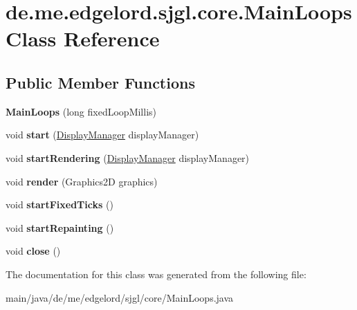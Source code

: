 \hypertarget{classde_1_1me_1_1edgelord_1_1sjgl_1_1core_1_1_main_loops}{}\section{de.\+me.\+edgelord.\+sjgl.\+core.\+Main\+Loops Class Reference}
\label{classde_1_1me_1_1edgelord_1_1sjgl_1_1core_1_1_main_loops}
\subsection*{Public Member Functions}
\begin{DoxyCompactItemize}
\item 
\mbox{\label{classde_1_1me_1_1edgelord_1_1sjgl_1_1core_1_1_main_loops_a852f58bdc48b19598f604e90a3913b29}} 
{\bfseries Main\+Loops} (long fixed\+Loop\+Millis)
\item 
\mbox{\label{classde_1_1me_1_1edgelord_1_1sjgl_1_1core_1_1_main_loops_a9b555b5a8a1d264fee9acd6e4fb5af00}} 
void {\bfseries start} (\mbox{\hyperlink{classde_1_1me_1_1edgelord_1_1sjgl_1_1display_1_1_display_manager}{Display\+Manager}} display\+Manager)
\item 
\mbox{\label{classde_1_1me_1_1edgelord_1_1sjgl_1_1core_1_1_main_loops_a9016a69b3dd76f3eb54d68acd83741bd}} 
void {\bfseries start\+Rendering} (\mbox{\hyperlink{classde_1_1me_1_1edgelord_1_1sjgl_1_1display_1_1_display_manager}{Display\+Manager}} display\+Manager)
\item 
\mbox{\label{classde_1_1me_1_1edgelord_1_1sjgl_1_1core_1_1_main_loops_ada82a4ffd1c34837860e5e6da6bb6977}} 
void {\bfseries render} (Graphics2D graphics)
\item 
\mbox{\label{classde_1_1me_1_1edgelord_1_1sjgl_1_1core_1_1_main_loops_adf9acffdd2a21d0b4d1133cb48c4bf8c}} 
void {\bfseries start\+Fixed\+Ticks} ()
\item 
\mbox{\label{classde_1_1me_1_1edgelord_1_1sjgl_1_1core_1_1_main_loops_aee4d6e0b861475572f0ce2614e14817a}} 
void {\bfseries start\+Repainting} ()
\item 
\mbox{\label{classde_1_1me_1_1edgelord_1_1sjgl_1_1core_1_1_main_loops_a85d1c1e6a8a787da84ae032f476280b0}} 
void {\bfseries close} ()
\end{DoxyCompactItemize}


The documentation for this class was generated from the following file\+:\begin{DoxyCompactItemize}
\item 
main/java/de/me/edgelord/sjgl/core/Main\+Loops.\+java\end{DoxyCompactItemize}
